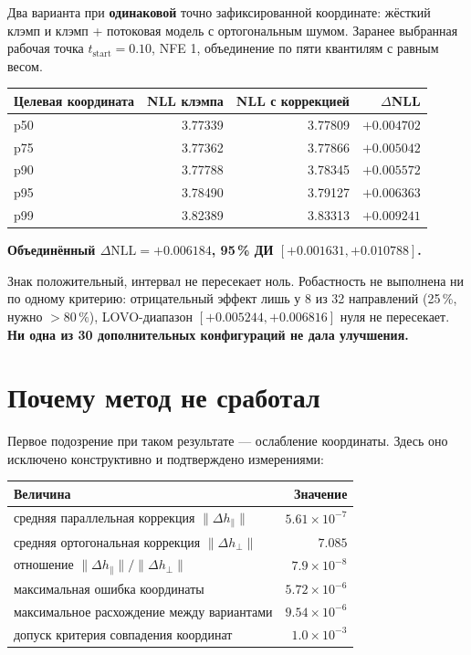 \documentclass[10pt,a4paper]{article}
\newcommand{\dhpar}{\lVert \Delta h_{\parallel} \rVert}
\newcommand{\dhperp}{\lVert \Delta h_{\perp} \rVert}
\begin{document}
Два варианта при \textbf{одинаковой} точно зафиксированной координате: жёсткий клэмп
и клэмп + потоковая модель с ортогональным шумом. Заранее выбранная рабочая точка
$t_{\mathrm{start}} = 0.10$, NFE 1, объединение по пяти квантилям с равным весом.

\begin{center}\small
\begin{tabular}{@{}lrrr@{}}
\toprule
Целевая координата & NLL клэмпа & NLL с коррекцией & $\Delta$NLL\\
\midrule
p50 & 3.77339 & 3.77809 & $+0.004702$\\
p75 & 3.77362 & 3.77866 & $+0.005042$\\
p90 & 3.77788 & 3.78345 & $+0.005572$\\
p95 & 3.78490 & 3.79127 & $+0.006363$\\
p99 & 3.82389 & 3.83313 & $+0.009241$\\
\bottomrule
\end{tabular}
\end{center}

\medskip
\textbf{Объединённый $\Delta\mathrm{NLL} = +0.006184$, 95\,\% ДИ
$[+0.001631, +0.010788]$.}

Знак положительный, интервал не пересекает ноль. Робастность не выполнена ни по
одному критерию: отрицательный эффект лишь у 8 из 32 направлений (25\,\%, нужно
$>80\,\%$), LOVO-диапазон $[+0.005244, +0.006816]$ нуля не пересекает.
\textbf{Ни одна из 30 дополнительных конфигураций не дала улучшения.}

\section{Почему метод не сработал}\label{sec:mechanism}

Первое подозрение при таком результате — ослабление координаты. Здесь оно
исключено конструктивно и подтверждено измерениями:

\begin{center}\small
\begin{tabular}{@{}lr@{}}
\toprule
Величина & Значение\\
\midrule
средняя параллельная коррекция $\dhpar$ & $5.61\times10^{-7}$\\
средняя ортогональная коррекция $\dhperp$ & $7.085$\\
отношение $\dhpar / \dhperp$ & $7.9\times10^{-8}$\\
максимальная ошибка координаты & $5.72\times10^{-6}$\\
максимальное расхождение между вариантами & $9.54\times10^{-6}$\\
допуск критерия совпадения координат & $1.0\times10^{-3}$\\
\bottomrule
\end{tabular}
\end{center}
\end{document}

